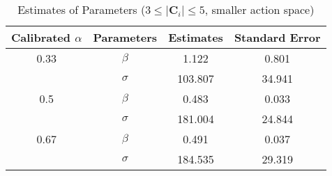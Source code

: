 \begin{table}[H]
    \centering
    \caption{Estimates of Parameters ($3 \leq |\mathbf{C}_i| \leq 5$, smaller action space)}
    \label{table: estimates (min_size=3 max_size=5 margin=1000)}
    \begin{tabular}{cccc}
        \toprule
        Calibrated $\alpha$ & Parameters & Estimates & Standard Error \\
        \midrule
        0.33                & $\beta$    & 1.122     & 0.801          \\
                            & $\sigma$   & 103.807   & 34.941         \\
        \midrule
        0.5                 & $\beta$    & 0.483     & 0.033          \\
                            & $\sigma$   & 181.004   & 24.844         \\
        \midrule
        0.67                & $\beta$    & 0.491     & 0.037          \\
                            & $\sigma$   & 184.535   & 29.319         \\
        \bottomrule
    \end{tabular}
\end{table}
